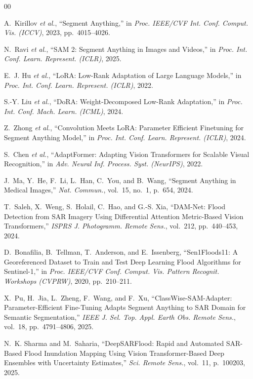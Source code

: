 \documentclass[conference]{IEEEtran}
\begin{document}
\begin{thebibliography}{00}

A.~Kirillov \textit{et al.}, ``Segment Anything,'' in \textit{Proc. IEEE/CVF Int. Conf. Comput. Vis. (ICCV)}, 2023, pp.~4015--4026.

N.~Ravi \textit{et al.}, ``SAM 2: Segment Anything in Images and Videos,'' in \textit{Proc. Int. Conf. Learn. Represent. (ICLR)}, 2025.

E.~J. Hu \textit{et al.}, ``LoRA: Low-Rank Adaptation of Large Language Models,'' in \textit{Proc. Int. Conf. Learn. Represent. (ICLR)}, 2022.

S.-Y. Liu \textit{et al.}, ``DoRA: Weight-Decomposed Low-Rank Adaptation,'' in \textit{Proc. Int. Conf. Mach. Learn. (ICML)}, 2024.

Z.~Zhong \textit{et al.}, ``Convolution Meets LoRA: Parameter Efficient Finetuning for Segment Anything Model,'' in \textit{Proc. Int. Conf. Learn. Represent. (ICLR)}, 2024.

S.~Chen \textit{et al.}, ``AdaptFormer: Adapting Vision Transformers for Scalable Visual Recognition,'' in \textit{Adv. Neural Inf. Process. Syst. (NeurIPS)}, 2022.

J.~Ma, Y.~He, F.~Li, L.~Han, C.~You, and B.~Wang, ``Segment Anything in Medical Images,'' \textit{Nat. Commun.}, vol.~15, no.~1, p.~654, 2024.

T.~Saleh, X.~Weng, S.~Holail, C.~Hao, and G.-S. Xia, ``DAM-Net: Flood Detection from SAR Imagery Using Differential Attention Metric-Based Vision Transformers,'' \textit{ISPRS J. Photogramm. Remote Sens.}, vol.~212, pp.~440--453, 2024.

D.~Bonafilia, B.~Tellman, T.~Anderson, and E.~Issenberg, ``Sen1Floods11: A Georeferenced Dataset to Train and Test Deep Learning Flood Algorithms for Sentinel-1,'' in \textit{Proc. IEEE/CVF Conf. Comput. Vis. Pattern Recognit. Workshops (CVPRW)}, 2020, pp.~210--211.

X.~Pu, H.~Jia, L.~Zheng, F.~Wang, and F.~Xu, ``ClassWise-SAM-Adapter: Parameter-Efficient Fine-Tuning Adapts Segment Anything to SAR Domain for Semantic Segmentation,'' \textit{IEEE J. Sel. Top. Appl. Earth Obs. Remote Sens.}, vol.~18, pp.~4791--4806, 2025.

N.~K. Sharma and M.~Saharia, ``DeepSARFlood: Rapid and Automated SAR-Based Flood Inundation Mapping Using Vision Transformer-Based Deep Ensembles with Uncertainty Estimates,'' \textit{Sci. Remote Sens.}, vol.~11, p.~100203, 2025.


\end{thebibliography}
\end{document}

